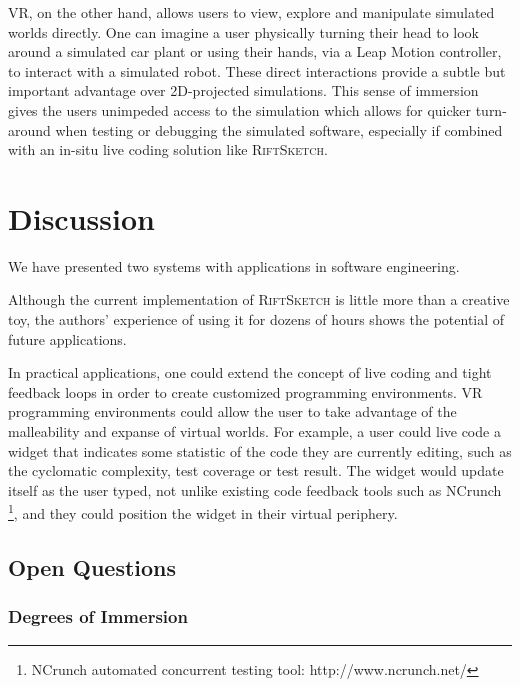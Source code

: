 \documentclass[conference]{IEEEtran}
\begin{document}
VR, on the other hand, allows users to view, explore and manipulate simulated worlds directly. One can imagine a user physically turning their head to look around a simulated car plant or using their hands, via a Leap Motion controller, to interact with a simulated robot. 
These direct interactions provide a subtle but important advantage over 2D-projected simulations. 
This sense of immersion gives the users unimpeded access to the simulation which allows for quicker turn-around when testing or debugging the simulated software, especially if combined with an in-situ live coding solution like \textsc{RiftSketch}.

\section{Discussion}
We have presented two systems with applications in software engineering.

Although the current implementation of \textsc{RiftSketch} is little more than a creative toy, the authors' experience of using it for dozens of hours shows the potential of future applications. 

In practical applications, one could extend the concept of live coding and tight feedback loops in order to create customized programming environments. 
VR programming environments could allow the user to take advantage of the malleability and expanse of virtual worlds. 
For example, a user could live code a widget that indicates some statistic of the code they are currently editing, such as the cyclomatic complexity, test coverage or test result. 
The widget would update itself as the user typed, not unlike existing code feedback tools such as NCrunch \footnote{NCrunch automated concurrent testing tool: http://www.ncrunch.net/}, and they could position the widget in their virtual periphery.

\subsection{Open Questions}


\subsubsection{Degrees of Immersion}
\end{document}

